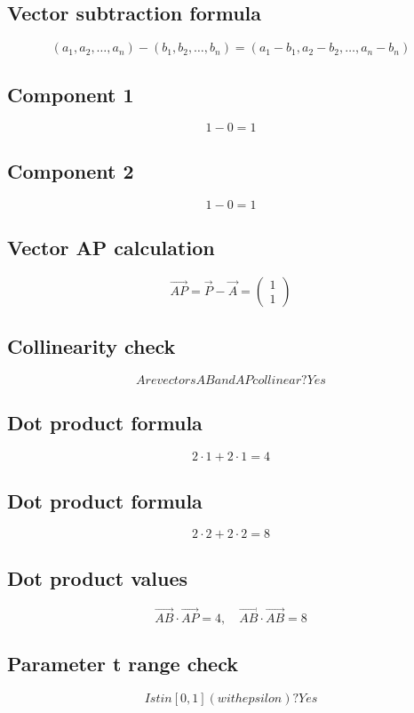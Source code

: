 \documentclass{article}
\begin{document}
\subsection*{ \vspace{1em} Vector subtraction formula}
\[
(a_1, a_2, \dots, a_n) - (b_1, b_2, \dots, b_n) = (a_1 - b_1, a_2 - b_2, \dots, a_n - b_n)
\]
\subsection*{ \vspace{1em} Component 1}
\[
1 - 0 = 1
\]
\subsection*{ \vspace{1em} Component 2}
\[
1 - 0 = 1
\]
\subsection*{ \vspace{1em} Vector AP calculation}
\[
\vec{AP} = \vec{P} - \vec{A} = \begin{pmatrix}1 \\ 1\end{pmatrix}
\]
\subsection*{ \vspace{1em} Collinearity check}
\[
Are vectors AB and AP collinear? Yes
\]
\subsection*{ \vspace{1em} Dot product formula}
\[
2 \cdot 1 + 2 \cdot 1 = 4
\]
\subsection*{ \vspace{1em} Dot product formula}
\[
2 \cdot 2 + 2 \cdot 2 = 8
\]
\subsection*{ \vspace{1em} Dot product values}
\[
\vec{AB} \cdot \vec{AP} = 4, \quad \vec{AB} \cdot \vec{AB} = 8
\]
\subsection*{ \vspace{1em} Parameter t range check}
\[
Is t in [0,1] (with epsilon)? Yes
\]
\end{document}
